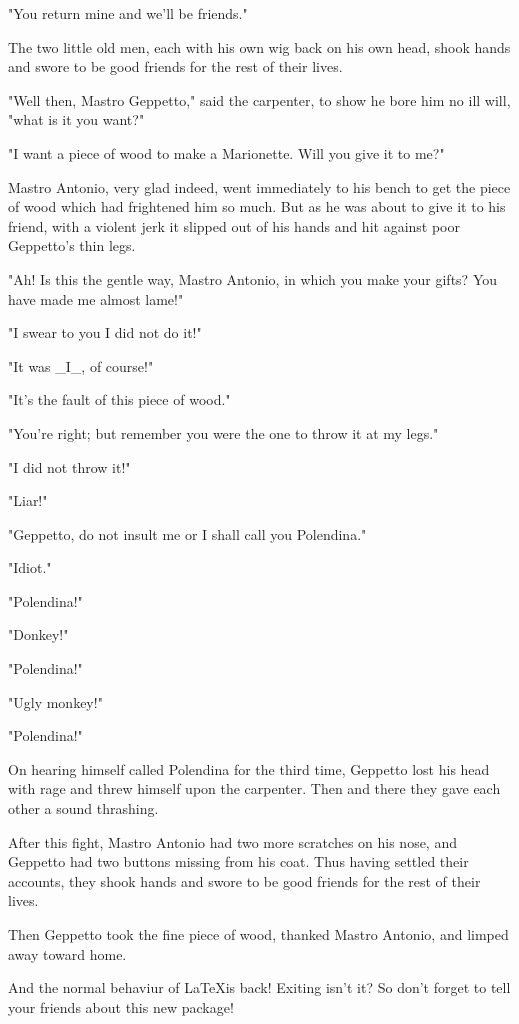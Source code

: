 \documentclass[12pt,twoside,twocolumn]{article}
\begin{document}
{  "You return mine and we'll be friends."
  
  The two little old men, each with his own wig back on
  his own head, shook hands and swore to be good friends
  for the rest of their lives.
  
  "Well then, Mastro Geppetto," said the carpenter, to
  show he bore him no ill will, "what is it you want?"
  
  "I want a piece of wood to make a Marionette.  Will you give it to
  me?"
    
  Mastro Antonio, very glad indeed, went immediately
  to his bench to get the piece of wood which had frightened
  him so much.  But as he was about to give it to his friend,
  with a violent jerk it slipped out of his hands and hit
  against poor Geppetto's thin legs.
  
  "Ah!  Is this the gentle way, Mastro Antonio, in which
  you make your gifts?  You have made me almost lame!"
  
  "I swear to you I did not do it!"
  
  "It was \_I\_, of course!"
  
  "It's the fault of this piece of wood."
  
  "You're right; but remember you were the one to throw it at my legs."
  
  "I did not throw it!"
  
  "Liar!"
  
  "Geppetto, do not insult me or I shall call you Polendina."
  
  "Idiot."
  
  "Polendina!"
  
  "Donkey!"
  
  "Polendina!"
  
  "Ugly monkey!"
  
  "Polendina!"
  
  On hearing himself called Polendina for the third time,
  Geppetto lost his head with rage and threw himself upon
  the carpenter.  Then and there they gave each other a
  sound thrashing.
  
  After this fight, Mastro Antonio had two more scratches
  on his nose, and Geppetto had two buttons missing from
  his coat.  Thus having settled their accounts, they shook
  hands and swore to be good friends for the rest of their lives.
  
  Then Geppetto took the fine piece of wood,
  thanked Mastro Antonio, and limped away toward home.
}
\endrotboxpages 

And the normal behaviur of \LaTeX is back!
Exiting isn't it? So don't forget to tell your friends about this new
package!
\end{document}
